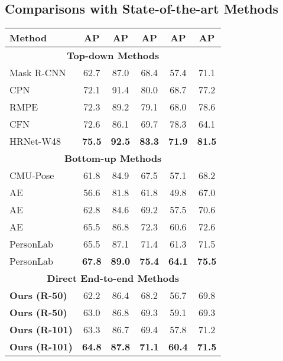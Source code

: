 \documentclass[10pt,twocolumn,letterpaper]{article}
\newcommand{\1}{{\mathbbm{1}}}
\begin{document}
{\subsection{Comparisons with State-of-the-art Methods}
\begin{table}
	\small
	\begin{center}
	\begin{tabular}{ l | c c c c c }
		\hline
		Method & AP & AP & AP & AP & AP \\
		\hline\hline
		\multicolumn{6}{c}{\textbf{Top-down Methods}} \\
		\hline
		Mask R-CNN \cite{he2017mask} & 62.7 & 87.0 & 68.4 & 57.4 & 71.1 \\
		CPN \cite{chen2018cascaded} & 72.1 & 91.4 & 80.0 & 68.7 & 77.2 \\
		RMPE \cite{fang2017rmpe} & 72.3 & 89.2 & 79.1 & 68.0 & 78.6 \\
		CFN \cite{huang2017coarse} & 72.6 & 86.1 & 69.7 & 78.3 & 64.1 \\
		HRNet-W48 \cite{sun2019deep} & \textbf{75.5} & \textbf{92.5} & \textbf{83.3} & \textbf{71.9} & \textbf{81.5} \\
		\hline
		\multicolumn{6}{c}{\textbf{Bottom-up Methods}} \\
		\hline
		CMU-Pose \cite{cao2017realtime} & 61.8 & 84.9 & 67.5 & 57.1 & 68.2 \\
		AE \cite{newell2017associative} & 56.6 & 81.8 & 61.8 & 49.8 & 67.0 \\
		AE & 62.8 & 84.6 & 69.2 & 57.5 & 70.6 \\
		AE & 65.5 & 86.8 & 72.3 & 60.6 & 72.6 \\
		PersonLab \cite{papandreou2018personlab} & 65.5 & 87.1 & 71.4 & 61.3 & 71.5 \\
		PersonLab & \textbf{67.8} & \textbf{89.0} & \textbf{75.4} & \textbf{64.1} & \textbf{75.5} \\
		\hline
		\multicolumn{6}{c}{\textbf{Direct End-to-end Methods}} \\
		\hline
		\textbf{Ours (R-50)} & 62.2 & 86.4 & 68.2 & 56.7 & 69.8 \\
		\textbf{Ours (R-50)} & 63.0 & 86.8 & 69.3 & 59.1 & 69.3 \\
		\textbf{Ours (R-101)} & 63.3 & 86.7 & 69.4 & 57.8 & 71.2 \\
		\textbf{Ours (R-101)} & \textbf{64.8} & \textbf{87.8} & \textbf{71.1} & \textbf{60.4} & \textbf{71.5} \\
		\hline
	\end{tabular}
	\end{center}

\end{table}}
\end{document}
